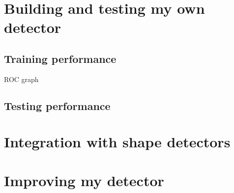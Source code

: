 \documentclass[onecolumn, 11pt, a4paper]{article}
\begin{document}
\clearpage

\section{Building and testing my own detector}

\subsection{Training performance}

ROC graph

\subsection{Testing performance}

\section{Integration with shape detectors}

\section{Improving my detector}



\clearpage
\begin{thebibliography}{9}
\end{thebibliography}
    
\end{document}
